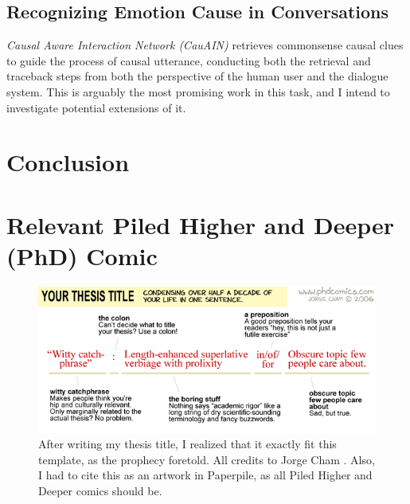 \documentclass[12pt]{report}
\begin{document}
\section{Recognizing Emotion Cause in Conversations}
\textit{Causal Aware Interaction Network (CauAIN)} \cite{Zhao2022-hv} retrieves commonsense causal clues to guide the process of causal utterance, conducting both the retrieval and traceback steps from both the perspective of the human user and the dialogue system.
This is arguably the most promising work in this task, and I intend to investigate potential extensions of it.


\chapter{Conclusion}


\begin{footnotesize}
    
    
\end{footnotesize}

\appendix

\chapter{Relevant Piled Higher and Deeper (PhD) Comic}

\begin{figure}[h!]
    \includegraphics[width=\textwidth]{phd-comics-718}
    \caption{After writing my thesis title, I realized that it exactly fit this template, as the prophecy foretold. All credits to Jorge Cham \cite{Cham2006-zx}. Also, I had to cite this as an artwork in Paperpile, as all Piled Higher and Deeper comics should be.}
\end{figure}
\end{document}
